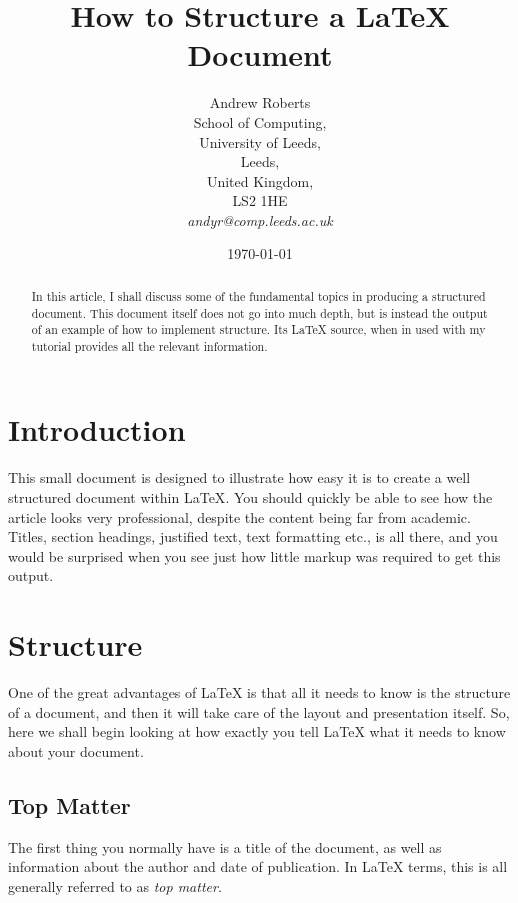\documentclass{article}
\begin{document}
\title{How to Structure a \LaTeX{} Document} %
\author{Andrew Roberts\\
  School of Computing,\\
  University of Leeds,\\
  Leeds,\\
  United Kingdom,\\
  LS2 1HE\\
  \emph{andyr@comp.leeds.ac.uk}}  %
\date{\today}  %
\maketitle

\begin{abstract}
  In this article, I shall discuss some of the fundamental topics in
  producing a structured document.  This document itself does not go into
  much depth, but is instead the output of an example of how to implement
  structure. Its \LaTeX{} source, when in used with my tutorial
  provides all the relevant information.  \end{abstract}

\section{Introduction}
This small document is designed to illustrate how easy it is to create a
well structured document within \LaTeX\cite{lamport94}.  You should quickly be able to
see how the article looks very professional, despite the content being
far from academic.  Titles, section headings, justified text, text
formatting etc., is all there, and you would be surprised when you see
just how little markup was required to get this output.

\section{Structure}
One of the great advantages of \LaTeX{} is that all it needs to know is
the structure of a document, and then it will take care of the layout
and presentation itself.  So, here we shall begin looking at how exactly
you tell \LaTeX{} what it needs to know about your document.

\subsection{Top Matter}
The first thing you normally have is a title of the document, as well as
information about the author and date of publication.  In \LaTeX{} terms,
this is all generally referred to as \emph{top matter}.
\end{document}
